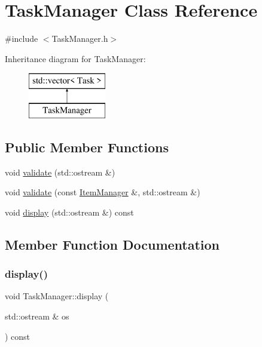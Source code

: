 \hypertarget{class_task_manager}{}\section{Task\+Manager Class Reference}
\label{class_task_manager}


{\ttfamily \#include $<$Task\+Manager.\+h$>$}

Inheritance diagram for Task\+Manager\+:\begin{figure}[H]
\begin{center}
\leavevmode
\includegraphics[height=2.000000cm]{class_task_manager}
\end{center}
\end{figure}
\subsection*{Public Member Functions}
\begin{DoxyCompactItemize}
\item 
void \mbox{\hyperlink{class_task_manager_a2ae3c30ca4e030440b64c383cbda8a73}{validate}} (std\+::ostream \&)
\item 
void \mbox{\hyperlink{class_task_manager_a59aea57b2ad273d6d95797f93d737fa0}{validate}} (const \mbox{\hyperlink{class_item_manager}{Item\+Manager}} \&, std\+::ostream \&)
\item 
void \mbox{\hyperlink{class_task_manager_a3564901af8fa7498b0fcca85fcaa5e64}{display}} (std\+::ostream \&) const
\end{DoxyCompactItemize}


\subsection{Member Function Documentation}
\mbox{\label{class_task_manager_a3564901af8fa7498b0fcca85fcaa5e64}} 
\subsubsection{\texorpdfstring{display()}{display()}}
{\footnotesize\ttfamily void Task\+Manager\+::display (\begin{DoxyParamCaption}\item[{std\+::ostream \&}]{os }\end{DoxyParamCaption}) const}

